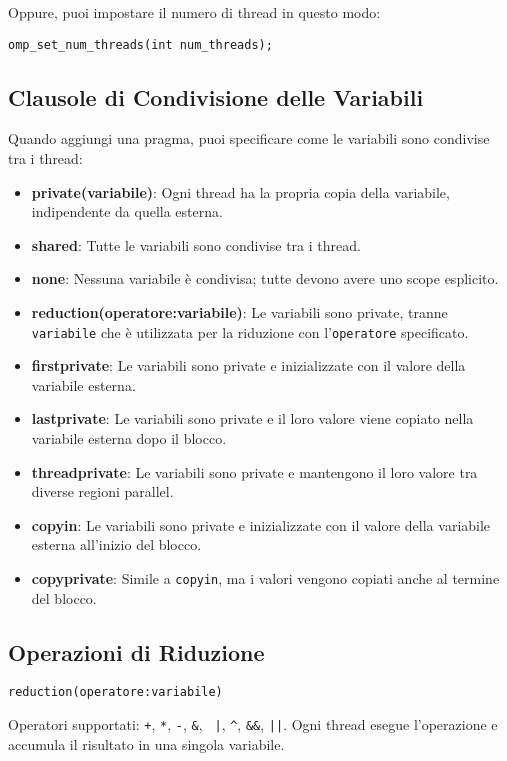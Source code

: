 \documentclass[a4paper,12pt]{article}
\begin{document}
Oppure, puoi impostare il numero di thread in questo modo:

\begin{verbatim}
omp_set_num_threads(int num_threads);
\end{verbatim}

\subsection{Clausole di Condivisione delle Variabili}
Quando aggiungi una pragma, puoi specificare come le variabili sono condivise tra i thread:
\begin{itemize}
    \item \textbf{private(variabile)}: Ogni thread ha la propria copia della variabile, indipendente da quella esterna.
    \item \textbf{shared}: Tutte le variabili sono condivise tra i thread.
    \item \textbf{none}: Nessuna variabile è condivisa; tutte devono avere uno scope esplicito.
    \item \textbf{reduction(operatore:variabile)}: Le variabili sono private, tranne \texttt{variabile} che è utilizzata per la riduzione con l'\texttt{operatore} specificato.
    \item \textbf{firstprivate}: Le variabili sono private e inizializzate con il valore della variabile esterna.
    \item \textbf{lastprivate}: Le variabili sono private e il loro valore viene copiato nella variabile esterna dopo il blocco.
    \item \textbf{threadprivate}: Le variabili sono private e mantengono il loro valore tra diverse regioni parallel.
    \item \textbf{copyin}: Le variabili sono private e inizializzate con il valore della variabile esterna all'inizio del blocco.
    \item \textbf{copyprivate}: Simile a \texttt{copyin}, ma i valori vengono copiati anche al termine del blocco.
\end{itemize}

\subsection{Operazioni di Riduzione}
\begin{verbatim}
reduction(operatore:variabile)
\end{verbatim}

Operatori supportati: \texttt{+}, \texttt{*}, \texttt{-}, \texttt{\&}, \texttt{ |}, \texttt{\^}, \texttt{\&\&}, \texttt{||}. Ogni thread esegue l'operazione e accumula il risultato in una singola variabile.
\end{document}
